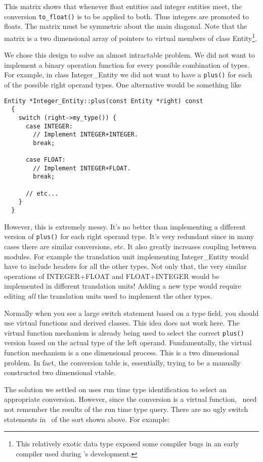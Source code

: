 \documentclass{report}
\begin{document}
This matrix shows that whenever float entities and integer entities meet, the conversion
\texttt{to\_float()} is to be applied to both. Thus integers are promoted to floats. The matrix
must be symmetric about the main diagonal. Note that the matrix is a two dimensional array of
pointers to virtual members of class Entity\footnote{This relatively exotic data type exposed
  some compiler bugs in an early compiler used during \CLAC's development.}.

We chose this design to solve an almost intractable problem. We did not want to implement a
binary operation function for every possible combination of types. For example, in class
Integer\_Entity we did not want to have a \texttt{plus()} for each of the possible right operand
types. One alternative would be something like

\begin{verbatim}
Entity *Integer_Entity::plus(const Entity *right) const
  {
    switch (right->my_type()) {
      case INTEGER:
        // Implement INTEGER+INTEGER.
        break;

      case FLOAT:
        // Implement INTEGER+FLOAT.
        break;

      // etc...
    }
  }
\end{verbatim}

However, this is extremely messy. It's no better than implementing a different version of
\texttt{plus()} for each right operand type. It's very redundant since in many cases there are
similar conversions, etc. It also greatly increases coupling between modules. For example the
translation unit implementing Integer\_Entity would have to include headers for all the other
types. Not only that, the very similar operations of INTEGER+FLOAT and FLOAT+INTEGER would be
implemented in different translation units! Adding a new type would require editing \emph{all}
the translation units used to implement the other types.

Normally when you see a large switch statement based on a type field, you should use virtual
functions and derived classes. This idea does not work here. The virtual function mechanism is
already being used to select the correct \texttt{plus()} version based on the actual type of the
left operand. Fundamentally, the virtual function mechanism is a one dimensional process. This
is a two dimensional problem. In fact, the conversion table is, essentially, trying to be a
manually constructed two dimensional vtable.

The solution we settled on uses run time type identification to select an appropriate
conversion. However, since the conversion is a virtual function, \CLAC\ need not remember the
results of the run time type query. There are no ugly switch statements in \CLAC\ of the sort
shown above. For example:
\end{document}
